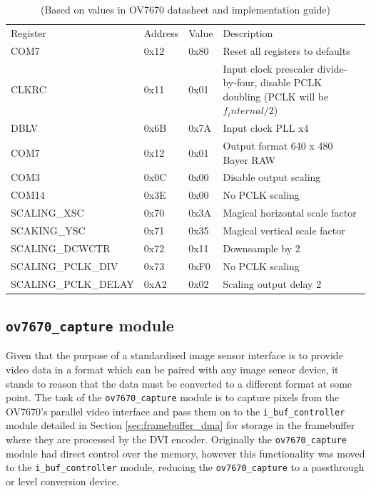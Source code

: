 \begin{table}
    \begin{tabular}{llll}
    Register            & Address   & Value     & Description                       \\
    COM7                & 0x12      & 0x80      & Reset all registers to defaults   \\
    CLKRC               & 0x11      & 0x01      & Input clock prescaler divide-by-four, disable PCLK doubling (PCLK will be \(f_internal / 2\)) \\
    DBLV                & 0x6B      & 0x7A      & Input clock PLL x4                \\
    COM7                & 0x12      & 0x01      & Output format 640 x 480 Bayer RAW \\
    COM3                & 0x0C      & 0x00      & Disable output scaling            \\
    COM14               & 0x3E      & 0x00      & No PCLK scaling                   \\
    SCALING\_XSC         & 0x70      & 0x3A      & Magical horizontal scale factor   \\
    SCAKING\_YSC         & 0x71      & 0x35      & Magical vertical scale factor     \\
    SCALING\_DCWCTR      & 0x72      & 0x11      & Downsample by 2           \\
    SCALING\_PCLK\_DIV    & 0x73      & 0xF0      & No PCLK scaling           \\
    SCALING\_PCLK\_DELAY  & 0xA2      & 0x02      & Scaling output delay 2    \\
    \end{tabular}
    \caption{(Based on values in OV7670 datasheet and implementation guide)}
    \label{table:ov7670_register_settings}
\end{table}

\subsection{\texttt{ov7670\_capture} module}
Given that the purpose of a standardised image sensor interface is to provide video data in a format which can be paired with any image sensor device, it stands to reason that the data must be converted to a different format at some point. The task of the \texttt{ov7670\_capture} module is to capture pixels from the OV7670's parallel video interface and pass them on to the \texttt{i\_buf\_controller} module detailed in Section \ref{sec:framebuffer_dma} for storage in the framebuffer where they are processed by the DVI encoder. Originally the \texttt{ov7670\_capture} module had direct control over the memory, however this functionality was moved to the \texttt{i\_buf\_controller} module, reducing the \texttt{ov7670\_capture} to a passthrough or level conversion device.

